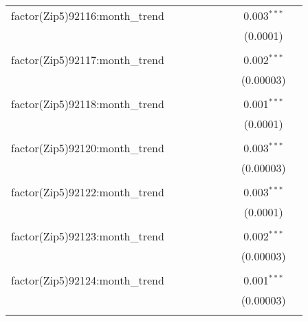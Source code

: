 \begin{table}[H]
{\begin{tabular}{@{\extracolsep{5pt}}lcccccccc}
  factor(Zip5)92116:month\_trend &  &  &  &  &  &  & 0.003$^{***}$ &  \\  

   &  &  &  &  &  &  & (0.0001) &  \\  

   & & & & & & & & \\  

  factor(Zip5)92117:month\_trend &  &  &  &  &  &  & 0.002$^{***}$ &  \\  

   &  &  &  &  &  &  & (0.00003) &  \\  

   & & & & & & & & \\  

  factor(Zip5)92118:month\_trend &  &  &  &  &  &  & 0.001$^{***}$ &  \\  

   &  &  &  &  &  &  & (0.0001) &  \\  

   & & & & & & & & \\  

  factor(Zip5)92120:month\_trend &  &  &  &  &  &  & 0.003$^{***}$ &  \\  

   &  &  &  &  &  &  & (0.00003) &  \\  

   & & & & & & & & \\  

  factor(Zip5)92122:month\_trend &  &  &  &  &  &  & 0.003$^{***}$ &  \\  

   &  &  &  &  &  &  & (0.0001) &  \\  

   & & & & & & & & \\  

  factor(Zip5)92123:month\_trend &  &  &  &  &  &  & 0.002$^{***}$ &  \\  

   &  &  &  &  &  &  & (0.00003) &  \\  

   & & & & & & & & \\  

  factor(Zip5)92124:month\_trend &  &  &  &  &  &  & 0.001$^{***}$ &  \\  

   &  &  &  &  &  &  & (0.00003) &  \\  

   & & & & & & & & \\  


\end{tabular}}
\end{table}
